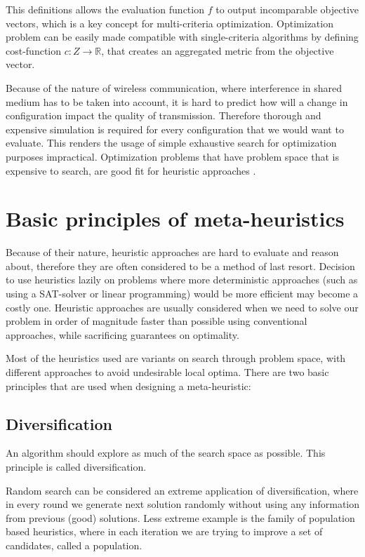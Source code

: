 \documentclass[12pt,oneside]{fithesis2}
\begin{document}
This definitions allows the evaluation function $f$ to output incomparable objective vectors, which is a key concept for multi-criteria optimization. Optimization problem can be easily made compatible with single-criteria algorithms by defining cost-function $c:Z \to \mathbb{R}$, that creates an aggregated metric from the objective vector.

Because of the nature of wireless communication, where interference in shared medium has to be taken into account, it is hard to predict how will a change in configuration impact the quality of transmission. Therefore thorough and expensive simulation is required for every configuration that we would want to evaluate. This renders the usage of simple exhaustive search for optimization purposes impractical. Optimization problems that have problem space that is expensive to search, are good fit for heuristic approaches \cite{talbi2009metaheuristics}. 

\section{Basic principles of meta-heuristics}

Because of their nature, heuristic approaches are hard to evaluate and reason about, therefore they are often considered to be a method of last resort. Decision to use heuristics lazily on problems where more deterministic approaches (such as using a SAT-solver or linear programming) would be more efficient may become a costly one. Heuristic approaches are usually considered when we need to solve our problem in order of magnitude faster than possible using conventional approaches, while sacrificing guarantees on optimality.

Most of the heuristics used are variants on search through problem space, with different approaches to avoid undesirable local optima.
There are two basic principles that are used when designing a meta-heuristic\cite{talbi2009metaheuristics}:

\subsection{Diversification}
An algorithm should explore as much of the search space as possible. This principle is called diversification.

Random search can be considered an extreme application of diversification, where in every round we generate next solution randomly without using any information from previous (good) solutions. Less extreme example is the family of population based heuristics, where in each iteration we are trying to improve a set of candidates, called a population.
\end{document}
